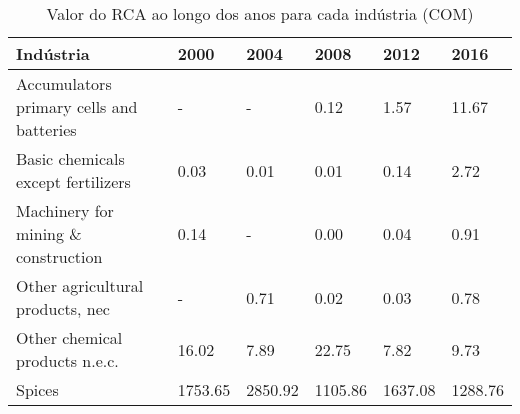 \begin{table}
\centering
\caption{Valor do RCA ao longo dos anos para cada indústria (COM)}
\label{tab:ex3-tempo-COM}
\begin{tabular}{p{6cm}p{1.5cm}p{1.5cm}p{1.5cm}p{1.5cm}p{1.5cm}}
\toprule
                               Indústria &    2000 &    2004 &    2008 &    2012 &    2016 \\
\midrule
Accumulators primary cells and batteries &       - &       - &    0.12 &    1.57 &   11.67 \\
      Basic chemicals except fertilizers &    0.03 &    0.01 &    0.01 &    0.14 &    2.72 \\
     Machinery for mining \& construction &    0.14 &       - &    0.00 &    0.04 &    0.91 \\
        Other agricultural products, nec &       - &    0.71 &    0.02 &    0.03 &    0.78 \\
          Other chemical products n.e.c. &   16.02 &    7.89 &   22.75 &    7.82 &    9.73 \\
                                  Spices & 1753.65 & 2850.92 & 1105.86 & 1637.08 & 1288.76 \\
\bottomrule
\end{tabular}
\end{table}
